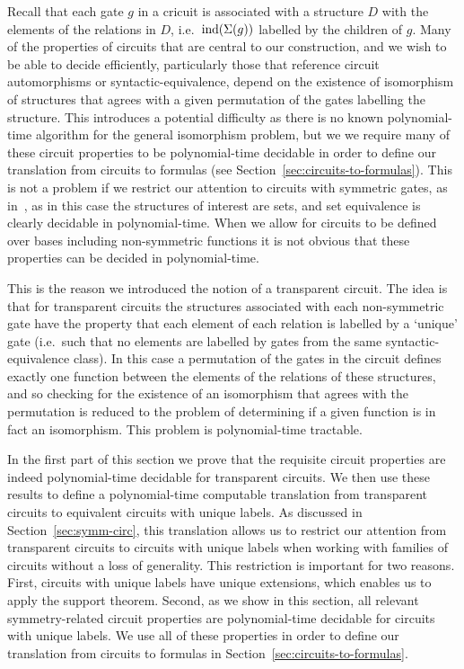 \documentclass[../paper.tex]{subfiles}
\begin{document}
Recall that each gate $g$ in a cricuit is associated with a structure $D$ with
the elements of the relations in $D$, i.e.\ $\text{\upshape ind}(\Sigma(g))$ labelled by the
children of $g$. Many of the properties of circuits that are central to our
construction, and we wish to be able to decide efficiently, particularly those
that reference circuit automorphisms or syntactic-equivalence, depend on the
existence of isomorphism of structures that agrees with a given permutation of
the gates labelling the structure. This introduces a potential difficulty as
there is no known polynomial-time algorithm for the general isomorphism problem,
but we we require many of these circuit properties to be polynomial-time
decidable in order to define our translation from circuits to formulas (see
Section~\ref{sec:circuits-to-formulas}). This is not a problem if we restrict
our attention to circuits with symmetric gates, as in~\cite{AndersonD17}, as in
this case the structures of interest are sets, and set equivalence is clearly
decidable in polynomial-time. When we allow for circuits to be defined over
bases including non-symmetric functions it is not obvious that these properties
can be decided in polynomial-time.

This is the reason we introduced the notion of a transparent circuit. The idea
is that for transparent circuits the structures associated with each
non-symmetric gate have the property that each element of each relation is
labelled by a `unique' gate (i.e.\ such that no elements are labelled by gates
from the same syntactic-equivalence class). In this case a permutation of the
gates in the circuit defines exactly one function between the elements of the
relations of these structures, and so checking for the existence of an
isomorphism that agrees with the permutation is reduced to the problem of
determining if a given function is in fact an isomorphism. This problem is
polynomial-time tractable.

In the first part of this section we prove that the requisite circuit properties
are indeed polynomial-time decidable for transparent circuits. We then use these
results to define a polynomial-time computable translation from transparent
circuits to equivalent circuits with unique labels. As discussed in
Section~\ref{sec:symm-circ}, this translation allows us to restrict our
attention from transparent circuits to circuits with unique labels when working
with families of circuits without a loss of generality. This restriction is
important for two reasons. First, circuits with unique labels have unique
extensions, which enables us to apply the support theorem. Second, as we show in
this section, all relevant symmetry-related circuit properties are
polynomial-time decidable for circuits with unique labels. We use all of these
properties in order to define our translation from circuits to formulas in
Section~\ref{sec:circuits-to-formulas}.
\end{document}
